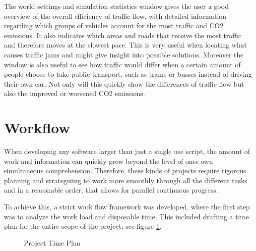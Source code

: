         The world settings and simulation statistics window gives the user a good overview of the overall efficiency of traffic flow, with detailed information regarding which groups of vehicles account for the most traffic and CO2 emissions. It also indicates which areas and roads that receive the most traffic and therefore moves at the slowest pace. This is very useful when locating what causes traffic jams and might give insight into possible solutions. Moreover the window is also useful to see how traffic would differ when a certain amount of people choose to take public transport, such as trams or busses instead of driving their own car. Not only will this quickly show the differences of traffic flow but also the improved or worsened CO2 emissions.


\section{Workflow}
    When developing any software larger than just a single use script, the amount of work and information can quickly grow beyond the level of ones own simultaneous comprehension. Therefore, these kinds of projects require rigorous planning and strategizing to work more smoothly through all the different tasks and in a reasonable order, that allows for parallel continuous progress.

    To achieve this, a strict work flow framework was developed, where the first step was to analyze the work load and disposable time. This included drafting a time plan for the entire scope of the project, see figure \ref{fig:time-plan}. 

    \begin{figure}[H]
        \centering
        \caption{Project Time Plan}
        \label{fig:time-plan}
    \end{figure}

